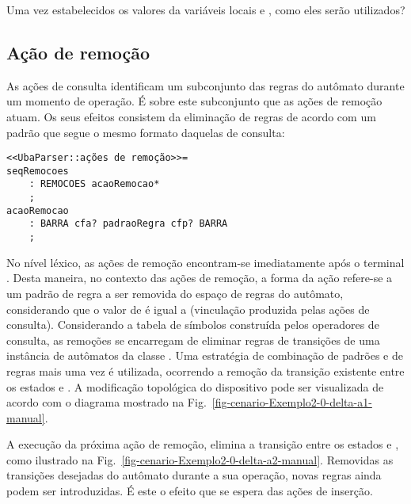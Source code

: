 Uma vez estabelecidos os valores da variáveis locais  e , como eles serão utilizados?

\subsection*{Ação de remoção}

As ações de consulta identificam um subconjunto das regras do autômato durante um momento de operação. É sobre este subconjunto que as ações de remoção atuam. Os seus efeitos consistem da eliminação de regras de acordo com um padrão que segue o mesmo formato daquelas de consulta:

\begin{lstlisting}[style=antlr]
<<UbaParser::ações de remoção>>=
seqRemocoes
    : REMOCOES acaoRemocao*
    ;
acaoRemocao
    : BARRA cfa? padraoRegra cfp? BARRA
    ;
\end{lstlisting}

\noindent
No nível léxico, as ações de remoção encontram-se imediatamente após o terminal . Desta maneira, no contexto das ações de remoção, a forma da ação  refere-se a um padrão de regra a ser removida do espaço de regras do autômato, considerando que o valor de  é igual a  (vinculação produzida pelas ações de consulta). Considerando a tabela de símbolos construída pelos operadores de consulta, as remoções se encarregam de eliminar regras de transições de uma instância de autômatos da classe . Uma estratégia de combinação de padrões e de regras mais uma vez é utilizada, ocorrendo a remoção da transição existente entre os estados  e . A modificação topológica do dispositivo  pode ser visualizada de acordo com o diagrama mostrado na Fig.~\ref{fig-cenario-Exemplo2-0-delta-a1-manual}.


A execução da próxima ação de remoção, elimina a transição entre os estados  e , como ilustrado na Fig.~\ref{fig-cenario-Exemplo2-0-delta-a2-manual}. Removidas as transições desejadas do autômato durante a sua operação, novas regras ainda podem ser introduzidas. É este o efeito que se espera das ações de inserção.



